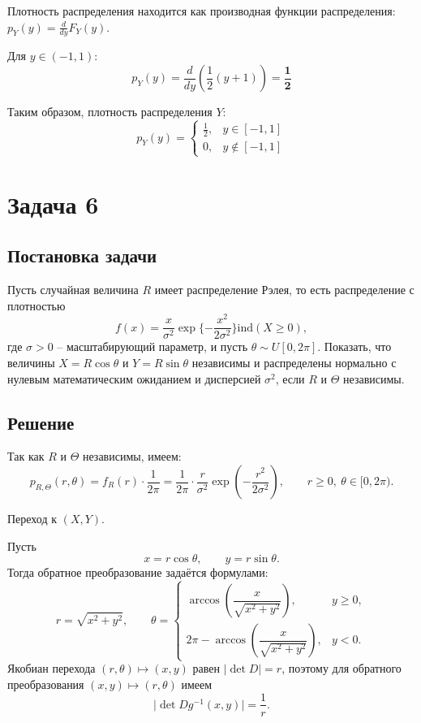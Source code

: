 \documentclass[a4paper,14pt]{extarticle}
\begin{document}
    Плотность распределения находится как производная функции распределения: $p_Y(y) = \frac{d}{dy} F_Y(y)$.

    Для $y \in (-1, 1)$:
    $$
    p_Y(y) = \frac{d}{dy} \left( \frac{1}{2}(y + 1) \right) = \mathbf{\frac{1}{2}}
    $$

    Таким образом, плотность распределения $Y$:
    $$
    \boxed{p_Y(y) = \begin{cases} 
    \frac{1}{2}, & y \in [-1, 1] \\
    0, & y \notin [-1, 1]
    \end{cases}}
    $$

    \section*{Задача 6}
    \subsection*{Постановка задачи}
    Пусть случайная величина $R$ имеет распределение Рэлея, то есть распределение с плотностью 
    \[f(x) = \frac{x}{\sigma^2} \exp \{- \frac{x^2}{2\sigma^2}\} \mathrm{ind}(X \ge 0),\]
    где $\sigma > 0$ -- масштабирующий параметр, и пусть $\theta \sim  U[0, 2\pi]$. 
    Показать, что величины $X = R\cos\theta$ и $Y = R\sin\theta$ независимы и распределены нормально с нулевым математическим ожиданием и дисперсией $\sigma^2$, если $R$ и $\Theta$ независимы.
    \subsection*{Решение}

    Так как $R$ и $\Theta$ независимы, имеем:
    \[
    p_{R,\Theta}(r,\theta) = f_R(r) \cdot \frac{1}{2\pi}
    = \frac{1}{2\pi} \cdot \frac{r}{\sigma^2} \exp\left(-\frac{r^2}{2\sigma^2}\right),
    \qquad r \ge 0, \ \theta \in [0, 2\pi).
    \]


    Переход к $(X,Y)$.

    Пусть
    \[
    x = r\cos\theta, \qquad y = r\sin\theta.
    \]
    Тогда обратное преобразование задаётся формулами:
    \[
    r = \sqrt{x^2 + y^2}, \qquad 
    \theta = 
    \begin{cases}
    \arccos\!\left(\dfrac{x}{\sqrt{x^2+y^2}}\right), & y \ge 0,\\[1em]
    2\pi - \arccos\!\left(\dfrac{x}{\sqrt{x^2+y^2}}\right), & y < 0.
    \end{cases}
    \]
    Якобиан перехода $(r,\theta) \mapsto (x,y)$ равен $|\det D| = r$, поэтому
    для обратного преобразования $(x,y) \mapsto (r,\theta)$ имеем
    \[
    \big|\det Dg^{-1}(x,y)\big| = \frac{1}{r}.
    \]
\end{document}
